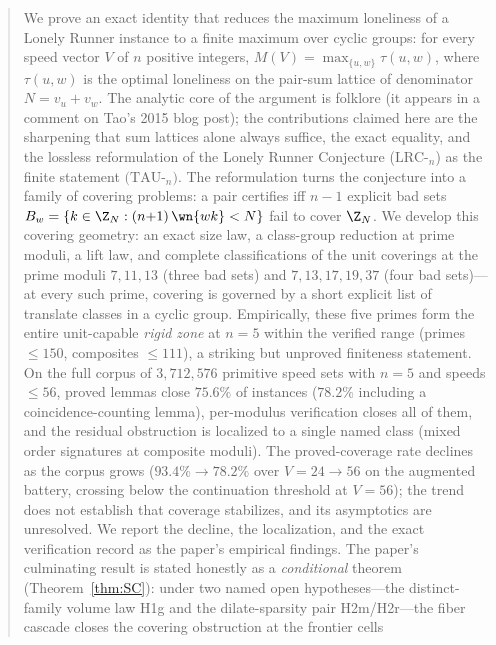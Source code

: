 
\begin{abstract}
\noindent
We prove an exact identity that reduces the maximum loneliness of a Lonely
Runner instance to a finite maximum over cyclic groups: for every speed
vector $V$ of $n$ positive integers,
$M(V)=\max_{\{u,w\}}\tau(u,w)$, where $\tau(u,w)$ is the optimal loneliness
on the pair-sum lattice of denominator $N=v_u+v_w$. The analytic core of the
argument is folklore (it appears in a comment on Tao's 2015 blog post); the
contributions claimed here are the sharpening that sum lattices alone always
suffice, the exact equality, and the lossless reformulation of the Lonely
Runner Conjecture ($\mathrm{LRC}$-$_n$) as the finite statement
$(\mathrm{TAU}$-$_n)$. The reformulation turns the conjecture into a family
of covering problems: a pair certifies iff $n-1$ explicit bad sets
$B_w=\{k\in\Z_N : (n{+}1)\,\wn{wk}<N\}$ fail to cover $\Z_N$. We develop
this covering geometry: an exact size law, a class-group reduction at prime
moduli, a lift law, and complete classifications of the unit coverings at
the prime moduli $7,11,13$ (three bad sets) and $7,13,17,19,37$ (four bad
sets)---at every such prime, covering is governed by a short explicit list
of translate classes in a cyclic group. Empirically, these five primes form
the entire unit-capable \emph{rigid zone} at $n=5$ within the verified range
(primes $\le 150$, composites $\le 111$), a striking but unproved finiteness
statement. On the full corpus of $3{,}712{,}576$ primitive speed sets with
$n=5$ and speeds $\le 56$, proved lemmas close $75.6\%$ of instances
($78.2\%$ including a coincidence-counting lemma), per-modulus verification
closes all of them, and the residual obstruction is localized to a single
named class (mixed order signatures at composite moduli). The proved-coverage
rate declines as the corpus grows ($93.4\%\to78.2\%$ over $V=24\to56$ on the
augmented battery, crossing below the continuation threshold at $V=56$);
the trend does not establish that coverage stabilizes, and its asymptotics
are unresolved. We report the decline, the localization, and the exact
verification record as the paper's empirical findings.
The paper's culminating result is stated honestly as a \emph{conditional}
theorem (Theorem~\ref{thm:SC}): under two named open hypotheses---the
distinct-family volume law H1g and the dilate-sparsity pair H2m/H2r---the
fiber cascade closes the covering obstruction at the frontier cells

\end{abstract}
